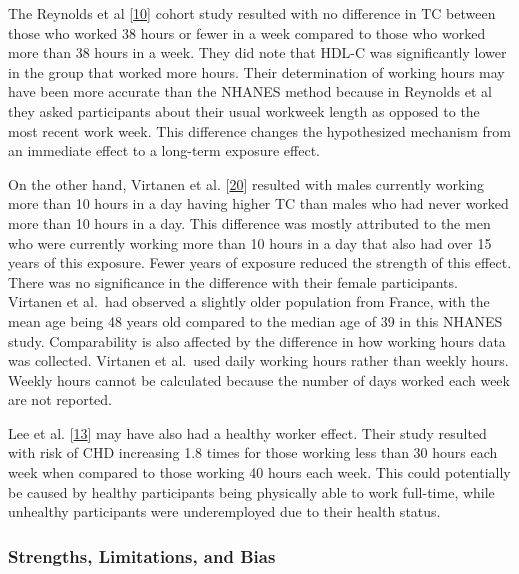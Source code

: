 \documentclass[]{elsarticle} %
\begin{document}
The Reynolds et al {[}\protect\hyperlink{ref-reynolds2018}{10}{]} cohort
study resulted with no difference in TC between those who worked 38
hours or fewer in a week compared to those who worked more than 38 hours
in a week. They did note that HDL-C was significantly lower in the group
that worked more hours. Their determination of working hours may have
been more accurate than the NHANES method because in Reynolds et al they
asked participants about their usual workweek length as opposed to the
most recent work week. This difference changes the hypothesized
mechanism from an immediate effect to a long-term exposure effect.

On the other hand, Virtanen et al.
{[}\protect\hyperlink{ref-virtanen2019}{20}{]} resulted with males
currently working more than 10 hours in a day having higher TC than
males who had never worked more than 10 hours in a day. This difference
was mostly attributed to the men who were currently working more than 10
hours in a day that also had over 15 years of this exposure. Fewer years
of exposure reduced the strength of this effect. There was no
significance in the difference with their female participants. Virtanen
et al.~had observed a slightly older population from France, with the
mean age being 48 years old compared to the median age of 39 in this
NHANES study. Comparability is also affected by the difference in how
working hours data was collected. Virtanen et al.~used daily working
hours rather than weekly hours. Weekly hours cannot be calculated
because the number of days worked each week are not reported.

Lee et al. {[}\protect\hyperlink{ref-lee2016}{13}{]} may have also had a
healthy worker effect. Their study resulted with risk of CHD increasing
1.8 times for those working less than 30 hours each week when compared
to those working 40 hours each week. This could potentially be caused by
healthy participants being physically able to work full-time, while
unhealthy participants were underemployed due to their health status.

\hypertarget{strengths-limitations-and-bias}{%
\subsubsection{Strengths, Limitations, and
Bias}\label{strengths-limitations-and-bias}}
\end{document}
